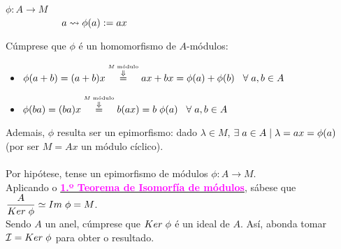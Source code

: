 \documentclass[twoside]{report}
\newcommand{\magbf}[1]{\textcolor{magenta}{\textbf{#1}}} %
\theoremstyle{mystyle}
\begin{document}
\begin{center}
    $\phi: A \longrightarrow M$\\
    \vspace{2mm}
    $\hspace{20mm} a \leadsto \phi(a) := ax$\\
\end{center}

\noindent Cúmprese que $\phi$ é un homomorfismo de $A$-módulos:\\

\begin{itemize}
    \item $\phi(a + b) = (a + b)x \overset{\overset{M \text{ módulo}}{\Downarrow}}{=} ax + bx = \phi(a) + \phi(b) \hspace{3mm} \forall \hspace{1mm} a,b \in A$
    \item $\phi(ba) = (ba)x \overset{\overset{M \text{ módulo}}{\Downarrow}}{=} b(ax) = b \hspace{1mm} \phi(a) \hspace{3mm} \forall \hspace{1mm} a,b \in A$
\end{itemize}

\noindent Ademais, $\phi$ resulta ser un epimorfismo: dado $\lambda \in M$, $\exists \hspace{1mm} a \in A \hspace{1mm} | \hspace{1mm} \lambda = ax = \phi(a)$ (por ser $M = Ax$ un módulo cíclico).\\

\noindent {}\\

\noindent Por hipótese, tense un epimorfismo de módulos $\phi: A \longrightarrow M$. \\

\noindent Aplicando o \hyperref[th3.1]{\magbf{1.º Teorema de Isomorfía de módulos}}, sábese que $\displaystyle \frac{A}{Ker \hspace{1mm} \phi} \simeq Im \hspace{1mm} \phi = M$.\\

\noindent Sendo $A$ un anel, cúmprese que $Ker \hspace{1mm} \phi$ é un ideal de $A$. Así, abonda tomar $\mathcal{I} = Ker \hspace{1mm} \phi$ para obter o resultado.\\
\end{document}
